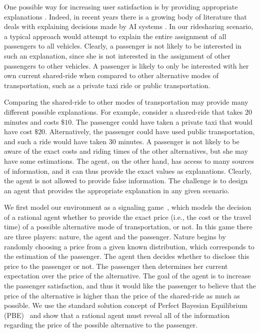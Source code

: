 \documentclass[letterpaper]{article} %
\begin{document}
One possible way for increasing user satisfaction is by providing appropriate explanations \cite{bradley2009dealing}. Indeed, in recent years there is a growing body of literature that deals with explaining decisions made by AI systems \cite{gunning2017explainable}.
In our ridesharing scenario, a typical %
approach would attempt to explain the entire assignment of all passengers to all vehicles. Clearly, a passenger is not likely to be interested in such an explanation, since she is not interested in the assignment of other passengers to other vehicles.
A passenger is likely to only be interested with her own current shared-ride when compared to other alternative modes of transportation, such as a private taxi ride or public transportation.

Comparing the shared-ride to other modes of transportation may provide many different possible explanations. 
For example, consider a shared-ride that takes $20$ minutes and costs $\$10$. The passenger could have taken a private taxi that would have cost $\$20$. Alternatively, the passenger could have used public transportation, and such a ride would have taken $30$ minutes. A passenger is not likely to be aware of the exact costs and riding times of the other alternatives, but she may have some estimations. The agent, on the other hand, has access to many sources of information, and it can thus provide the exact values as explanations. Clearly, the agent is not allowed to provide false information. The challenge is to design an agent that provides the appropriate explanation in any given scenario.

We first model our environment as a signaling game~\cite{spence1974market}, which models the decision of a rational agent whether to provide the exact price (i.e., the cost or the travel time) of a possible alternative mode of transportation, or not.  
In this game there are three players: nature, the agent and the passenger. 
Nature begins by randomly choosing a price from a given known distribution, which corresponds to the estimation of the passenger.
The agent then decides whether to disclose this price to the passenger or not. The passenger then determines her current expectation over the price of the alternative. The goal of the agent is to increase the passenger satisfaction, and thus it would like the passenger to believe that the price of the alternative is higher than the price of the shared-ride as much as possible. We use the standard solution concept of Perfect Bayesian Equilibrium (PBE)~\cite{fudenberg1991perfect} and show that a rational agent must reveal all of the information regarding the price of the possible alternative to the passenger.
\end{document}
